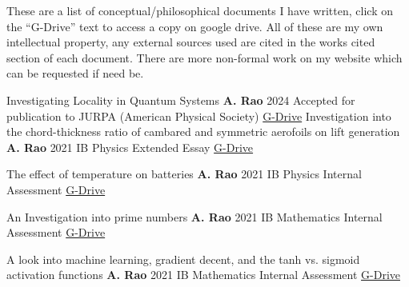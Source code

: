 \documentclass[%
               doublesided,
               paper=a4,
               fontsize=10pt
              ]{resumestyle}
\begin{document}
These are a list of conceptual/philosophical documents I have written, click on the ``G-Drive'' text to access a copy on google drive. All of these are my own intellectual property, any external sources used are cited in the works cited section of each document. There are more non-formal work on my website which can be requested if need be.


\bigskip

\publication
	{Investigating Locality in Quantum Systems} %
	{\textbf{A. Rao}} %
	{2024} %
	{Accepted for publication to JURPA (American Physical Society)} %
    {\href{https://drive.google.com/file/d/11Jxuwosy_RHILA6zEOKnV90gzT-gSnZz/view?usp=drive_link}{G-Drive}}
\publication
	{Investigation into the chord-thickness ratio of cambared and symmetric aerofoils on lift generation} %
	{\textbf{A. Rao}} %
	{2021} %
	{IB Physics Extended Essay} %
	{\href{https://drive.google.com/file/d/1iNuz6GyCQ5tocmtymL6gZ6pcuWnWGaJR/view?usp=sharing}{G-Drive}} %
	
\publication
	{The effect of temperature on batteries} %
	{\textbf{A. Rao}} %
	{2021} %
	{IB Physics Internal Assessment} %
	{\href{https://drive.google.com/file/d/1GWGu-Hs1JLPM09Opu7atbjhXZf3iJpHj/view?usp=sharing}{G-Drive}} %

\publication
	{An Investigation into prime numbers} %
	{\textbf{A. Rao}} %
	{2021} %
	{IB Mathematics Internal Assessment} %
	{\href{https://drive.google.com/file/d/14eHbjy9PMu8KufXfvyv0dE8Dfuy3ZLTy/view?usp=sharing}{G-Drive}} %
	
\publication
	{A look into machine learning, gradient decent, and the tanh vs. sigmoid activation functions} %
	{\textbf{A. Rao}} %
	{2021} %
	{IB Mathematics Internal Assessment} %
	{\href{https://drive.google.com/file/d/1kVpSQky80j6iVUuVikYTPtVWeeBq6dii/view?usp=sharing}{G-Drive}} %
	
\end{document}
